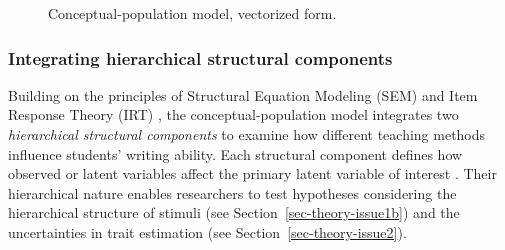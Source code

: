 \documentclass[
  authoryear,
  review,
  1p]{elsarticle}
\begin{document}
\begin{figure}[H]

\begin{minipage}{\linewidth}

\centering{

\[
\begin{aligned}
  O^{cp}_{R} & := f_{O}(D_{R}) \\
  D_{R} & := f_{D}(T_{IA}, B_{JK})
\end{aligned}
\]

}


\end{minipage}%
\newline
\begin{minipage}{\linewidth}



\end{minipage}%

\caption{\label{fig-cj04}Conceptual-population model, vectorized form.}

\end{figure}%

\subsubsection{Integrating hierarchical structural
components}\label{sec-theory-theoretical_P3}

Building on the principles of Structural Equation Modeling (SEM)
\citep[pp.~138]{Hoyle_et_al_2023} and Item Response Theory (IRT)
\citetext{\citealp[chap.~6]{Fox_2010}; \citealp[chap.~24]{vanderLinden_et_al_2017_I}},
the conceptual-population model integrates two \emph{hierarchical
structural components} to examine how different teaching methods
influence students' writing ability. Each structural component defines
how observed or latent variables affect the primary latent variable of
interest \citep{Everitt_et_al_2010}. Their hierarchical nature enables
researchers to test hypotheses considering the hierarchical structure of
stimuli (see Section~\ref{sec-theory-issue1b}) and the uncertainties in
trait estimation (see Section~\ref{sec-theory-issue2}).
\end{document}
